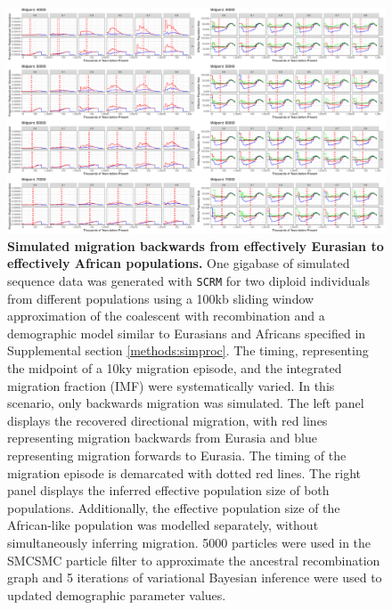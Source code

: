 \begin{figure}
	\centering
	\includegraphics[width=\textwidth]{plot/backward_different_starts.pdf}
	\caption[Simulated migration backwards from effectively Eurasian to effectively African populations]{{\bf Simulated migration backwards from effectively Eurasian to effectively African populations.} One gigabase of simulated sequence data was generated with {\tt SCRM} for two diploid individuals from different populations using a 100kb sliding window approximation of the coalescent with recombination and a demographic model similar to Eurasians and Africans specified in Supplemental section \ref{methods:simproc}. The timing, representing the midpoint of a 10ky migration episode, and the integrated migration fraction (IMF) were systematically varied. In this scenario, only backwards migration was simulated. The left panel displays the recovered directional migration, with red lines representing migration backwards from Eurasia and blue representing migration forwards to Eurasia. The timing of the migration episode is demarcated with dotted red lines. The right panel displays the inferred effective population size of both populations. Additionally, the effective population size of the African-like population was modelled separately, without simultaneously inferring migration. 5000 particles were used in the SMCSMC particle filter to approximate the ancestral recombination graph and 5 iterations of variational Bayesian inference were used to updated demographic parameter values.}
	\label{fig:backsim}
\end{figure}

